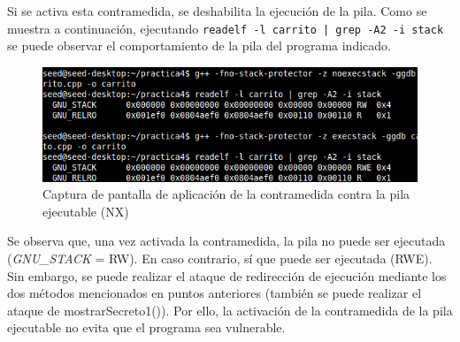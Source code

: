 \documentclass[10pt,a4paper]{article}
\begin{document}
Si se activa esta contramedida, se deshabilita la ejecución de la pila. Como se muestra a continuación, ejecutando \texttt{readelf -l carrito | grep -A2 -i stack} se puede observar el comportamiento de la pila del programa indicado.
\begin{figure}[h!]
	\centering
	\includegraphics[scale=0.6]{images/contramedida_3.png}
	\caption{Captura de pantalla de aplicación de la contramedida contra la pila ejecutable (NX)}
	\label{fig:contramedida3}
\end{figure}

Se observa que, una vez activada la contramedida, la pila no puede ser ejecutada (\textit{GNU\_STACK} = RW). En caso contrario, sí que puede ser ejecutada (RWE).
Sin embargo, se puede realizar el ataque de redirección de ejecución mediante los dos métodos mencionados en puntos anteriores (también se puede realizar el ataque de mostrarSecreto1()). Por ello, la activación de la contramedida de la pila ejecutable no evita que el programa sea vulnerable.
\end{document}
